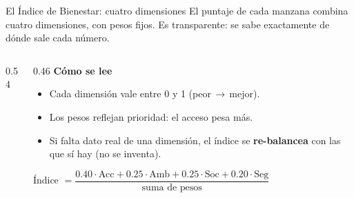 \documentclass[aspectratio=169,11pt]{beamer}
\newcommand{\lead}[1]{{\color{tPrimary}\large #1}\par\medskip}
\begin{document}
\begin{frame}{El Índice de Bienestar: cuatro dimensiones}
\lead{El puntaje de cada manzana combina cuatro dimensiones, con pesos fijos. Es transparente: se sabe exactamente de dónde sale cada número.}
\begin{columns}[T]
\begin{column}{0.54\textwidth}
\end{column}
\begin{column}{0.46\textwidth}
\footnotesize
\textbf{\color{tPrimary}Cómo se lee}
\begin{itemize}\footnotesize
  \item Cada dimensión vale entre 0 y 1 (peor\,$\rightarrow$\,mejor).
  \item Los pesos reflejan prioridad: el acceso pesa más.
  \item Si falta dato real de una dimensión, el índice se \textbf{re-balancea} con las que sí hay (no se inventa).
\end{itemize}
\smallskip
{\color{tMuted}Índice $=\dfrac{0.40\cdot\text{Acc}+0.25\cdot\text{Amb}+0.25\cdot\text{Soc}+0.20\cdot\text{Seg}}{\text{suma de pesos}}$}
\end{column}
\end{columns}
\end{frame}
\end{document}

